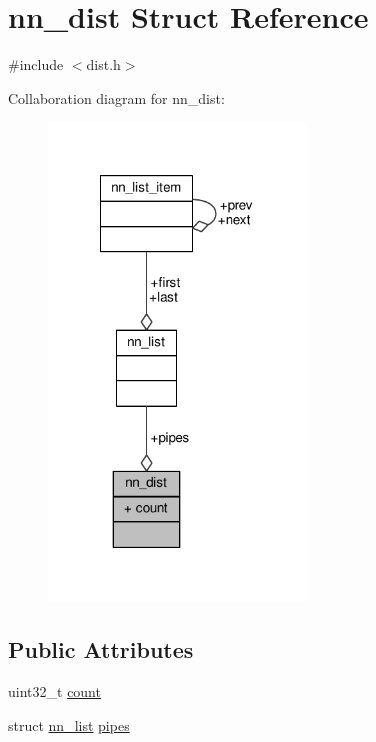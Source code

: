 \hypertarget{structnn__dist}{}\section{nn\+\_\+dist Struct Reference}
\label{structnn__dist}


{\ttfamily \#include $<$dist.\+h$>$}



Collaboration diagram for nn\+\_\+dist\+:\nopagebreak
\begin{figure}[H]
\begin{center}
\leavevmode
\includegraphics[width=194pt]{structnn__dist__coll__graph}
\end{center}
\end{figure}
\subsection*{Public Attributes}
\begin{DoxyCompactItemize}
\item 
uint32\+\_\+t \hyperlink{structnn__dist_a334300196bd129e8c909122435bef82a}{count}
\item 
struct \hyperlink{structnn__list}{nn\+\_\+list} \hyperlink{structnn__dist_a9ebfbe8b26a7da288e04b2cb6fd6c6f9}{pipes}
\end{DoxyCompactItemize}


